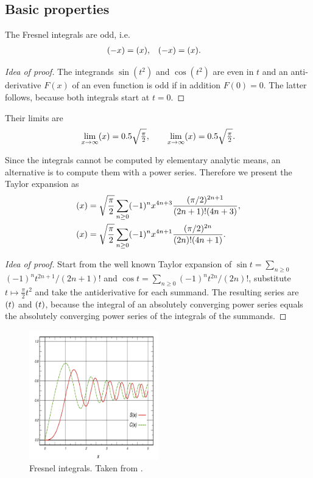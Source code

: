 \documentclass[12pt]{article}
\let\C=\relax
\DeclareMathOperator\C{C} %
\def\d#1{{\,\ud#1\,}}
\let\S=\relax
\DeclareMathOperator\S{S} %
\begin{document}
\subsection{Basic properties}
The Fresnel integrals are odd, i.e.
\begin{align*}
	\S(-x) &= \S(x), & \C(-x) &= \C(x).
\end{align*}
\begin{proof}[Idea of proof]  The integrands $\sin(t^2)$ and $\cos(t^2)$ are even in $t$ and an anti-derivative $F(x)$ of an even function is odd if in addition $F(0)=0$.  The latter follows, because both integrals start at $t=0$.
\end{proof}

Their limits are
\[  \lim_{x\to\infty} \S(x) = 0.5\sqrt{\tfrac\pi2},\qquad  \lim_{x\to\infty} \C(x) = 0.5\sqrt{\tfrac\pi2}.
\]

Since the integrals cannot be computed by elementary analytic means, an alternative is to compute them with a power series.  Therefore we present the Taylor expansion as
\begin{align*}
  \S(x) &= \sqrt{\frac\pi2}\sum_{n\ge0} (-1)^nx^{4n+3}\frac{(\pi/2)^{2n+1}}{(2n+1)!(4n+3)}, \\
  \C(x) &= \sqrt{\frac\pi2}\sum_{n\ge0} (-1)^nx^{4n+1}\frac{(\pi/2)^{2n}}{(2n)!(4n+1)}.
\end{align*}
\begin{proof}[Idea of proof]  Start from the well known Taylor expansion of $\sin t = \sum_{n\ge0}$ $(-1)^n t^{2n+1}/(2n+1)!$ and $\cos t = \sum_{n\ge0} (-1)^nt^{2n}/(2n)!$, substitute $t\mapsto \tfrac\pi2 t^2$ and take the antiderivative for each summand.  The resulting series are $\S(t)$ and $\C(t)$, because the integral of an absolutely converging power series equals the absolutely converging power series of the integrals of the summands.
\end{proof}

\begin{figure}[h!]
	\centering
	\includegraphics[width=0.5\textwidth]{Fresnel-Integrals-(Normalised).png}
	\caption{Fresnel integrals.  Taken from \cite[/Fresnel\_Integral]{wiki}.}
\end{figure}
\end{document}
